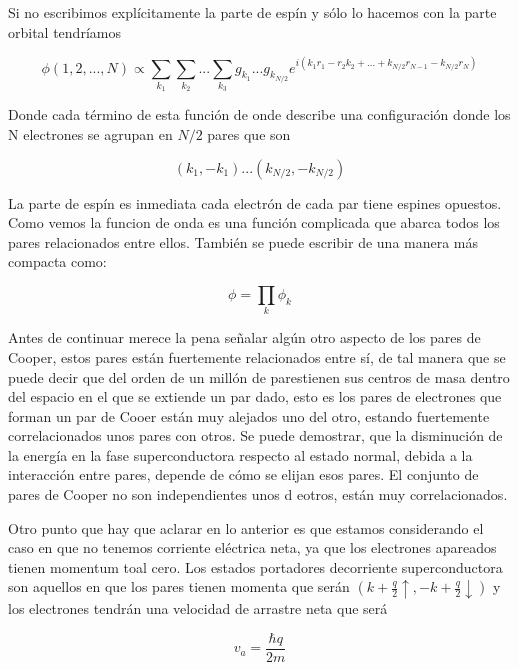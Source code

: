 Si no escribimos explícitamente la parte de espín y sólo lo hacemos con la parte orbital tendríamos

\begin{equation}
    \phi(1,2,...,N) \propto \sum_{k_1} \sum_{k_2} ... \sum_{k_3} g_{k_1} ... g_{k_{N/2}} e^{i (k_1 r_1 - r_2 k_2 + ... + k_{N/2} r_{N-1} - k_{N/2} r_N)}
\end{equation}

Donde cada término de esta función de onde describe una configuración donde los N electrones se agrupan en $N/2$ pares que son

\begin{equation}
    (k_1, -k_1) ... (k_{N/2}, -k_{N/2})
\end{equation}

La parte de espín es inmediata cada electrón de cada par tiene espines opuestos. Como vemos la funcion de onda es una función complicada que abarca todos los pares relacionados entre ellos. También se puede escribir de una manera más compacta como:

\begin{equation}
    \phi = \prod\limits_k \phi_k
\end{equation}

Antes de continuar merece la pena señalar algún otro aspecto de los pares de Cooper, estos pares están fuertemente relacionados entre sí, de tal manera que se puede decir que del orden de un millón de parestienen sus centros de masa dentro del espacio en el que se extiende un par dado, esto es los pares de electrones que forman un par de Cooer están muy alejados uno del otro, estando fuertemente correlacionados unos pares con otros. Se puede demostrar, que la disminución de la energía en la fase superconductora respecto al estado normal, debida a la interacción entre pares, depende de cómo se elijan esos pares. El conjunto de pares de Cooper no son independientes unos d eotros, están muy correlacionados.

Otro punto que hay que aclarar en lo anterior es que estamos considerando el caso en que no tenemos corriente eléctrica neta, ya que los electrones apareados tienen momentum toal cero. Los estados portadores  decorriente superconductora son aquellos en que los pares tienen momenta que serán $(k + \frac{q}{2} \uparrow, -k + \frac{q}{2} \downarrow)$ y los electrones tendrán una velocidad de arrastre neta que será

\begin{equation}
    v_a = \frac{\hbar q}{2m}
\end{equation}

